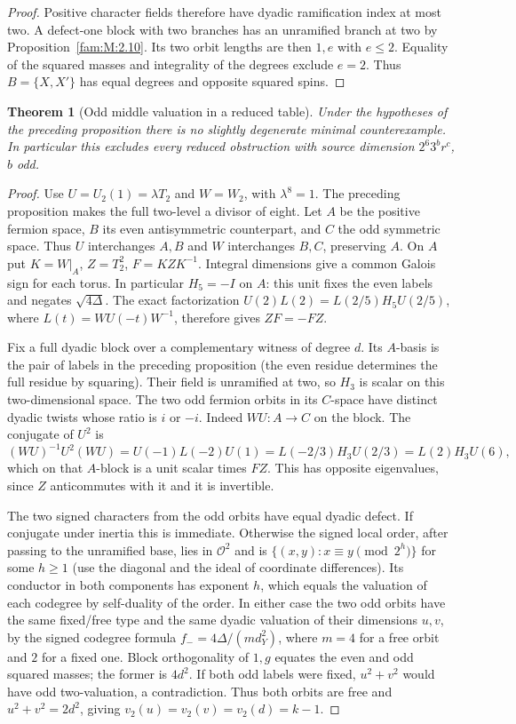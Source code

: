 \documentclass[11pt,a4paper]{article}
\numberwithin{equation}{section}
\newtheorem{theorem}{Theorem}[section]
\theoremstyle{remark}
\begin{document}
\begin{proof}
Positive character fields therefore have dyadic ramification index at
most two. A defect-one block with two branches has an unramified branch
at two by Proposition~\ref{fam:M:2.10}. Its two orbit lengths are
then $1,e$ with $e\le2$. Equality of the squared masses and integrality
of the degrees exclude $e=2$. Thus $B=\{X,X'\}$ has equal degrees and
opposite squared spins. \end{proof}

\begin{theorem}[Odd middle valuation in a reduced table]\label{fam:Q:7.2}
Under the hypotheses of the preceding proposition there is no
slightly degenerate minimal counterexample. In particular this excludes
every reduced obstruction with source dimension $2^6 3^b r^c$, $b$ odd.
\end{theorem}
\begin{proof}
Use $U=U_2(1)=\lambda T_2$ and $W=W_2$, with $\lambda^8=1$.
The preceding proposition makes the full two-level a divisor of eight.
Let $A$ be the positive fermion space, $B$ its even antisymmetric
counterpart, and $C$ the odd symmetric space. Thus $U$ interchanges
$A,B$ and $W$ interchanges $B,C$, preserving $A$.
On $A$ put $K=W|_A$, $Z=T_2^2$, $F=KZK^{-1}$. Integral dimensions
give a common Galois sign for each torus. In particular $H_5=-I$ on
$A$: this unit fixes the even labels and negates $\sqrt{4\Delta}$.
The exact factorization $U(2)L(2)=L(2/5)H_5U(2/5)$, where
$L(t)=WU(-t)W^{-1}$, therefore gives $ZF=-FZ$.

Fix a full dyadic block over a complementary witness of degree $d$.
Its $A$-basis is the pair of labels in the preceding proposition
(the even residue determines the full residue by squaring). Their
field is unramified at two, so $H_3$ is scalar on this two-dimensional
space. The two odd fermion orbits in its $C$-space have distinct
dyadic twists whose ratio is $i$ or $-i$. Indeed $WU:A\to C$ on the
block. The conjugate of $U^2$ is
\[
 (WU)^{-1}U^2(WU)
  =U(-1)L(-2)U(1)=L(-2/3)H_3U(2/3)=L(2)H_3U(6),
\]
which on that $A$-block is a unit scalar times $FZ$. This has
opposite eigenvalues, since $Z$ anticommutes with it and it is invertible.

The two signed characters from the odd orbits have equal dyadic
defect. If conjugate under inertia this is immediate. Otherwise the
signed local order, after passing to the unramified base, lies in
$\mathcal O^2$ and is
$\{(x,y):x\equiv y\pmod {2^h}\}$ for some $h\ge1$ (use the
diagonal and the ideal of coordinate differences). Its conductor in
both components has exponent $h$, which equals the valuation of
each codegree by self-duality of the order. In either case the
two odd orbits have the same fixed/free type and the same dyadic
valuation of their dimensions $u,v$, by the signed codegree formula
$f_-=4\Delta/(m d_Y^2)$, where $m=4$ for a free orbit and $2$
for a fixed one. Block orthogonality of $1,g$ equates the even
and odd squared masses; the former is $4d^2$. If both odd labels
were fixed, $u^2+v^2$ would have odd two-valuation, a contradiction.
Thus both orbits are free and $u^2+v^2=2d^2$, giving
$v_2(u)=v_2(v)=v_2(d)=k-1$.


\end{proof}
\end{document}
